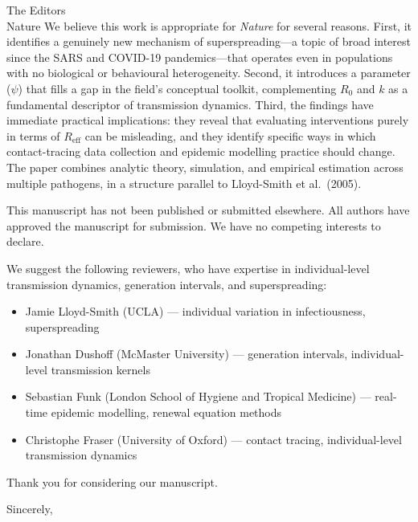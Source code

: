 \documentclass[11pt]{letter}
\begin{document}
\begin{letter}{The Editors\\Nature}
We believe this work is appropriate for \textit{Nature} for several reasons. First, it identifies a genuinely new mechanism of superspreading---a topic of broad interest since the SARS and COVID-19 pandemics---that operates even in populations with no biological or behavioural heterogeneity. Second, it introduces a parameter ($\psi$) that fills a gap in the field's conceptual toolkit, complementing $R_0$ and $k$ as a fundamental descriptor of transmission dynamics. Third, the findings have immediate practical implications: they reveal that evaluating interventions purely in terms of $R_\text{eff}$ can be misleading, and they identify specific ways in which contact-tracing data collection and epidemic modelling practice should change. The paper combines analytic theory, simulation, and empirical estimation across multiple pathogens, in a structure parallel to Lloyd-Smith et al.\ (2005).

This manuscript has not been published or submitted elsewhere. All authors have approved the manuscript for submission. We have no competing interests to declare.

We suggest the following reviewers, who have expertise in individual-level transmission dynamics, generation intervals, and superspreading:

\begin{itemize}
\item Jamie Lloyd-Smith (UCLA) --- individual variation in infectiousness, superspreading
\item Jonathan Dushoff (McMaster University) --- generation intervals, individual-level transmission kernels
\item Sebastian Funk (London School of Hygiene and Tropical Medicine) --- real-time epidemic modelling, renewal equation methods
\item Christophe Fraser (University of Oxford) --- contact tracing, individual-level transmission dynamics
\end{itemize}

Thank you for considering our manuscript.

\closing{Sincerely,}

\end{letter}
\end{document}
